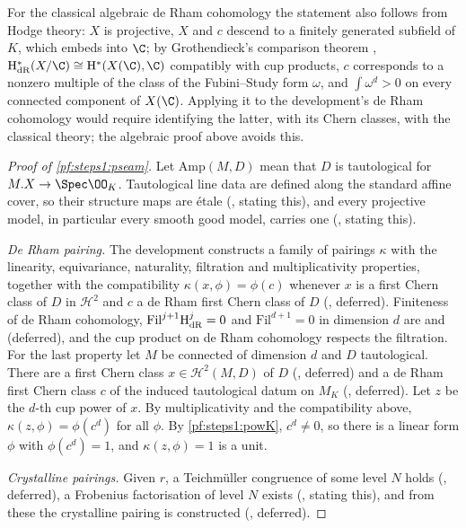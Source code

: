 \begin{remark}\label{pf:steps1:powKrem}
For the classical algebraic de Rham cohomology the statement also follows from Hodge theory: $X$ is projective, $X$ and $c$ descend
to a finitely generated subfield of $K$, which embeds into $\C$; by Grothendieck's comparison theorem \cite{Grothendieck1966},
$\stepsIH^*_{\mathrm{dR}}(X/\C)\cong\stepsIH^*(X(\C),\C)$ compatibly with cup products, $c$ corresponds to a nonzero multiple of
the class of the Fubini--Study form $\omega$, and $\int\omega^d>0$ on every connected component of $X(\C)$. Applying it to the
development's de Rham cohomology would require identifying the latter, with its Chern classes, with the classical theory; the
algebraic proof above avoids this.
\end{remark}

\begin{proof}[Proof of \cref{pf:steps1:pseam}]
Let $\mathrm{Amp}(M,D)$ mean that $D$ is tautological for $M.X\to\Spec\OO_K$. Tautological line data are defined along the
standard affine cover, so their structure maps are \'etale (,
stating this), and every projective model, in particular every smooth good model, carries one
(, stating this).

\emph{De Rham pairing.} The development constructs a family of pairings $\kappa$ with the linearity, equivariance,
naturality, filtration and multiplicativity properties, together with the compatibility $\kappa(x,\phi)=\phi(c)$ whenever
$x$ is a first Chern class of $D$ in $\mathcal H^2$ and $c$ a de Rham first Chern class of $D$
(, deferred). Finiteness of de Rham
cohomology, $\mathrm{Fil}^{j+1}\mathrm{H}^j_{\mathrm{dR}}=0$ and $\mathrm{Fil}^{d+1}=0$ in dimension $d$ are
 and 
(deferred), and the cup product on de Rham cohomology respects the filtration. For the last property let $M$ be connected
of dimension $d$ and $D$ tautological. There are a first Chern class $x\in\mathcal H^2(M,D)$ of $D$
(, deferred) and a de Rham first Chern class
$c$ of the induced tautological datum on $M_K$ (,
deferred). Let $z$ be the $d$-th cup power of $x$. By multiplicativity and the compatibility above,
$\kappa(z,\phi)=\phi(c^d)$ for all $\phi$. By \cref{pf:steps1:powK}, $c^d\ne0$, so there is a linear form $\phi$ with
$\phi(c^d)=1$, and $\kappa(z,\phi)=1$ is a unit.

\emph{Crystalline pairings.} Given $r$, a Teichm\"uller congruence of some level $N$ holds
(, deferred), a Frobenius factorisation of level $N$ exists
(, stating this), and from these the crystalline pairing is
constructed (, deferred).
\end{proof}

